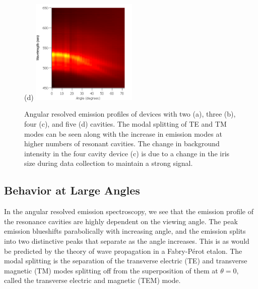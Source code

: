 \documentclass{report}
\begin{document}
\begin{figure}[h!]
            (d)
            \includegraphics[width=0.45\textwidth]{images/n5_heatmap.png}
            \caption{Angular resolved emission profiles of devices with two (a), three (b), four (c), and five (d) cavities. The modal splitting of TE and TM modes can be seen along with the increase in emission modes at higher numbers of resonant cavities. The change in background intensity in the four cavity device (c) is due to a change in the iris size during data collection to maintain a strong signal.}
            \label{fig:heatmaps}
		\end{figure}
    
        \subsection{Behavior at Large Angles} \label{largeAngle}
		In the angular resolved emission spectroscopy, we see that the emission profile of the resonance cavities are highly dependent on the viewing angle. The peak emission blueshifts parabolically with increasing angle, and the emission splits into two distinctive peaks that separate as the angle increases. This is as would be predicted by the theory of wave propagation in a Fabry-P\'erot etalon\cite{Lim2011}. The modal splitting is the separation of the transverse electric (TE) and transverse magnetic (TM) modes splitting off from the superposition of them at $\theta=0$, called the transverse electric and magnetic (TEM) mode. %

    
\end{document}
